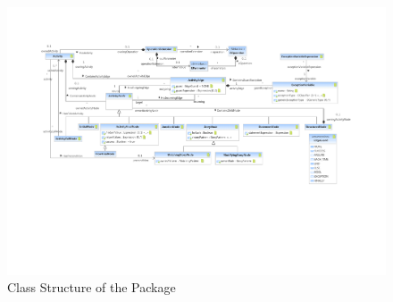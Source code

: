 %
%

\begin{figure}[htbp]
  \centering
  \includegraphics[width=\textheight,
  angle=90]{figures/A_technical-reference/packages/storydiagrams_activities/storydiagrams-activities}
  \caption{Class Structure of the  Package}
  \label{fig:MM:activities}
\end{figure}
